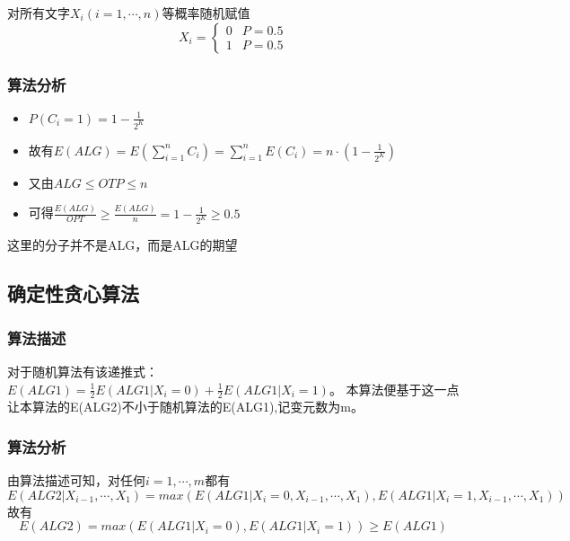 对所有文字$X_i (i=1,\cdots,n)$等概率随机赋值
\[
	X_i=\begin{cases}
		0 &P=0.5\\
		1 &P=0.5
	\end{cases}
\]

\subsubsection{算法分析}
\begin{itemize}
	\item $P(C_i=1)=1-\frac{1}{2^K} $
	\item 故有$E(ALG)=E(\sum\limits_{i=1}^n C_i)=\sum\limits_{i=1}^n E(C_i)=n\cdot (1-\frac{1}{2^K})$
	\item 又由$ALG\leqslant OTP\leqslant n$
	\item 可得$\frac{E(ALG)}{OPT}\geqslant \frac{E(ALG)}{n}=1-\frac{1}{2^K}\geqslant 0.5$
\end{itemize}
\begin{remark}
	这里的分子并不是ALG，而是ALG的期望
\end{remark}

\subsection{确定性贪心算法}

\subsubsection{算法描述}

对于随机算法有该递推式：$E(ALG1)=\frac{1}{2}E(ALG1|X_i=0)+\frac{1}{2}E(ALG1|X_i=1)$。
本算法便基于这一点让本算法的E(ALG2)不小于随机算法的E(ALG1),记变元数为m。

\begin{algorithm}
\end{algorithm}

\subsubsection{算法分析}
由算法描述可知，对任何$i=1,\cdots,m$都有
\begin{displaymath}
	E(ALG2|X_{i-1},\cdots,X_1)=max(E(ALG1|X_i=0,X_{i-1},\cdots,X_1),E(ALG1|X_i=1,X_{i-1},\cdots,X_1))	
\end{displaymath}
故有
\begin{displaymath}
E(ALG2)=max(E(ALG1|X_i=0),E(ALG1|X_i=1))\geqslant E(ALG1)
\end{displaymath}

